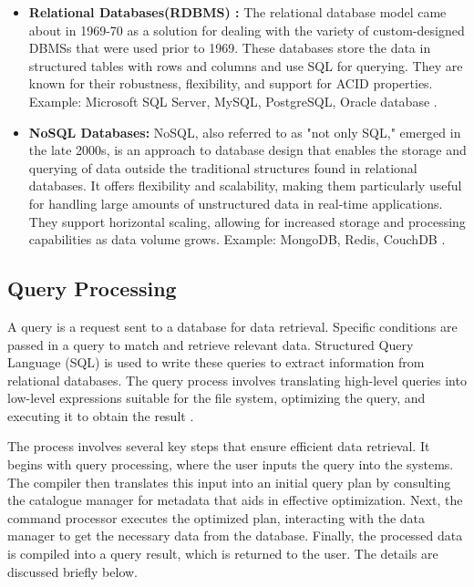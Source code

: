\begin{itemize}
    \item \textbf{Relational Databases(RDBMS) :} The relational database model came about in 1969-70 as a solution for dealing with the variety of custom-designed DBMSs that were used prior to 1969. These databases store the data in structured tables with rows and columns and use SQL for querying. They are known for their robustness, flexibility, and support for ACID properties. Example: Microsoft SQL Server, MySQL, PostgreSQL, Oracle database \cite{editor-2024,foote-2023}.
    
    \item \textbf{NoSQL Databases:} NoSQL, also referred to as "not only SQL," emerged in the late 2000s, is an approach to database design that enables the storage and querying of data outside the traditional structures found in relational databases. It offers flexibility and scalability, making them particularly useful for handling large amounts of unstructured data in real-time applications. They support horizontal scaling, allowing for increased storage and processing capabilities as data volume grows. Example: MongoDB, Redis, CouchDB \cite{ibm-2024,justacademy_nosql_characteristics}.
\end{itemize}

\subsection{Query Processing }
A query is a request sent to a database for data retrieval. Specific conditions are passed in a query to match and retrieve relevant data. Structured Query Language (SQL) is used to write these queries to extract information from relational databases. The query process involves translating high-level queries into low-level expressions suitable for the file system, optimizing the query, and executing it to obtain the result \cite{wwwnaukricom-no-date}.

The process involves several key steps that ensure efficient data retrieval. It begins with query processing, where the user inputs the query into the systems. The compiler then translates this input into an initial query plan by consulting the catalogue manager for metadata that aids in effective optimization. Next, the command processor executes the optimized plan, interacting with the data manager to get the necessary data from the database. Finally, the processed data is compiled into a query result, which is returned to the user. The details are discussed briefly below.

